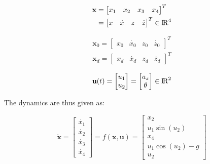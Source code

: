 \documentclass[letterpaper, 10 pt, conference]{ieeeconf}
\begin{document}
\begin{equation}
  \begin{split}
    \textbf{x}
      &= \begin{bmatrix}
        x_{1} & x_{2} & x_{3} & x_{4}
      \end{bmatrix}^{T} \\ 
      &= \begin{bmatrix}
        x & \dot{x} & z & \dot{z}
      \end{bmatrix}^{T} \in {\rm I\!R}^{4}
  \end{split}
\end{equation}

\begin{equation}
  \begin{split}
    \textbf{x}_{0} = \begin{bmatrix}
        x_{0} & \dot{x_{0}} & z_{0} & \dot{z_{0}}
    \end{bmatrix}^{T} \\
    \textbf{x}_{d} = \begin{bmatrix}
        x_{d} & \dot{x_{d}} & z_{d} & \dot{z_{d}}
    \end{bmatrix}^{T}
  \end{split}
\end{equation}

\begin{equation}
  \textbf{u}(t)
    = \begin{bmatrix} u_{1} \\ u_{2} \end{bmatrix}
    = \begin{bmatrix} a_{z} \\ \theta \end{bmatrix}
    \in {\rm I\!R}^{2}
\end{equation}

The dynamics are thus given as:

\begin{equation}
  \dot{\textbf{x}} =
    \begin{bmatrix}
      \dot{x_{1}} \\ \dot{x_{2}} \\ \dot{x_{3}} \\ \dot{x_{4}}
    \end{bmatrix} =
    f(\textbf{x}, \textbf{u}) =
    \begin{bmatrix}
      x_{2} \\
      u_{1} \sin(u_{2}) \\
      x_{4} \\
      u_{1} \cos(u_{2}) - g \\
      u_{2}
    \end{bmatrix}
\end{equation}
\end{document}
